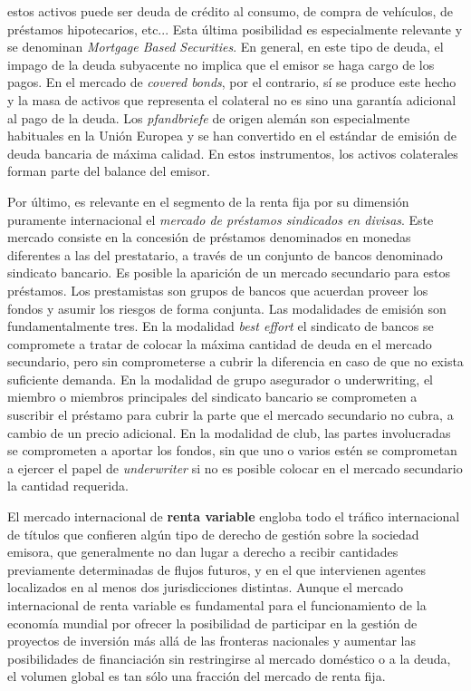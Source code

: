 \documentclass{nuevotema}
\begin{document}
estos activos puede ser deuda de crédito al consumo, de compra de vehículos, de préstamos hipotecarios, etc... Esta última posibilidad es especialmente relevante y se denominan \textit{Mortgage Based Securities}. En general, en este tipo de deuda, el impago de la deuda subyacente no implica que el emisor se haga cargo de los pagos. En el mercado de \textit{covered bonds}, por el contrario, sí se produce este hecho y la masa de activos que representa el colateral no es sino una garantía adicional al pago de la deuda. Los \textit{pfandbriefe} de origen alemán son especialmente habituales en la Unión Europea y se han convertido en el estándar de emisión de deuda bancaria de máxima calidad. En estos instrumentos, los activos colaterales forman parte del balance del emisor. 

Por último, es relevante en el segmento de la renta fija por su dimensión puramente internacional el \textit{mercado de préstamos sindicados en divisas}. Este mercado consiste en la concesión de préstamos  denominados en monedas diferentes a las del prestatario, a través de un conjunto de bancos denominado sindicato bancario. Es posible la aparición de un mercado secundario para estos préstamos. Los prestamistas son grupos de bancos que acuerdan proveer los fondos y asumir los riesgos de forma conjunta. Las modalidades de emisión son fundamentalmente tres. En la modalidad \textit{best effort} el sindicato de bancos se compromete a tratar de colocar la máxima cantidad de deuda en el mercado secundario, pero sin comprometerse a cubrir la diferencia en caso de que no exista suficiente demanda. En la modalidad de grupo asegurador o underwriting, el miembro o miembros principales del sindicato bancario se comprometen a suscribir el préstamo para cubrir la parte que el mercado secundario no cubra, a cambio de un precio adicional. En la modalidad de club, las partes involucradas se comprometen a aportar los fondos, sin que uno o varios estén se comprometan a ejercer el papel de \textit{underwriter} si no es posible colocar en el mercado secundario la cantidad requerida.

El mercado internacional de \textbf{renta variable} engloba todo el tráfico internacional de títulos que confieren algún tipo de derecho de gestión sobre la sociedad emisora, que generalmente no dan lugar a derecho a recibir cantidades previamente determinadas de flujos futuros, y en el que intervienen agentes localizados en al menos dos jurisdicciones distintas. Aunque el mercado internacional de renta variable es fundamental para el funcionamiento de la economía mundial por ofrecer la posibilidad de participar en la gestión de proyectos de inversión más allá de las fronteras nacionales y aumentar las posibilidades de financiación sin restringirse al mercado doméstico o a la deuda, el volumen global es tan sólo una fracción del mercado de renta fija. 
\end{document}
